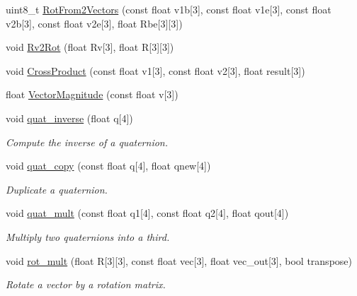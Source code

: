 \begin{DoxyCompactItemize}
uint8\-\_\-t \hyperlink{group___tau_labs_math_ga0848733f9025a839c84f7e7b71d87c63}{\-Rot\-From2\-Vectors} (const float v1b\mbox{[}3\mbox{]}, const float v1e\mbox{[}3\mbox{]}, const float v2b\mbox{[}3\mbox{]}, const float v2e\mbox{[}3\mbox{]}, float \-Rbe\mbox{[}3\mbox{]}\mbox{[}3\mbox{]})
\item 
void \hyperlink{group___tau_labs_math_ga43ed3db7237f03a6488c8dd7b987b1bd}{\-Rv2\-Rot} (float \-Rv\mbox{[}3\mbox{]}, float \-R\mbox{[}3\mbox{]}\mbox{[}3\mbox{]})
\item 
void \hyperlink{group___tau_labs_math_ga6dc0e97647b4b3a5689c46aa415fe0b8}{\-Cross\-Product} (const float v1\mbox{[}3\mbox{]}, const float v2\mbox{[}3\mbox{]}, float result\mbox{[}3\mbox{]})
\item 
float \hyperlink{group___tau_labs_math_gaf5edfeac1bff286891d26b8c7fcc9958}{\-Vector\-Magnitude} (const float v\mbox{[}3\mbox{]})
\item 
void \hyperlink{group___tau_labs_math_gab25d503661ed9e31c9616b13c72d1ccd}{quat\-\_\-inverse} (float q\mbox{[}4\mbox{]})
\begin{DoxyCompactList}\small\item\em \-Compute the inverse of a quaternion. \end{DoxyCompactList}\item 
void \hyperlink{group___tau_labs_math_ga61bd7b4ee83de9d89b69dea4179edacc}{quat\-\_\-copy} (const float q\mbox{[}4\mbox{]}, float qnew\mbox{[}4\mbox{]})
\begin{DoxyCompactList}\small\item\em \-Duplicate a quaternion. \end{DoxyCompactList}\item 
void \hyperlink{group___tau_labs_math_ga0b537ea767fb853ee9d9797f389eaade}{quat\-\_\-mult} (const float q1\mbox{[}4\mbox{]}, const float q2\mbox{[}4\mbox{]}, float qout\mbox{[}4\mbox{]})
\begin{DoxyCompactList}\small\item\em \-Multiply two quaternions into a third. \end{DoxyCompactList}\item 
void \hyperlink{group___tau_labs_math_ga51d2a5ec28cbf272fe73aa5ea343a355}{rot\-\_\-mult} (float \-R\mbox{[}3\mbox{]}\mbox{[}3\mbox{]}, const float vec\mbox{[}3\mbox{]}, float vec\-\_\-out\mbox{[}3\mbox{]}, bool transpose)
\begin{DoxyCompactList}\small\item\em \-Rotate a vector by a rotation matrix. \end{DoxyCompactList}\item 

\end{DoxyCompactItemize}
